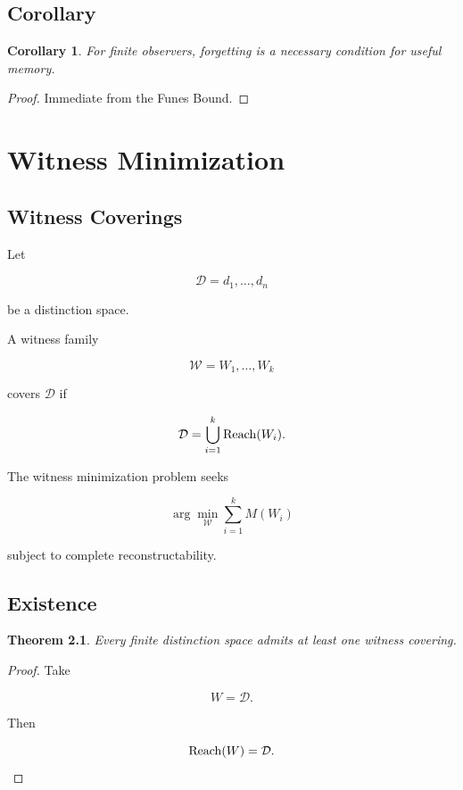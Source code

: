 \documentclass[12pt,oneside]{book}
\theoremstyle{plain} \newtheorem{theorem}{Theorem}[chapter] \newtheorem{lemma}[theorem]{Lemma} \newtheorem{proposition}[theorem]{Proposition} \newtheorem{corollary}[theorem]{Corollary}
\theoremstyle{definition} \newtheorem{definition}[theorem]{Definition} \newtheorem{axiom}[theorem]{Axiom} \newtheorem{construction}[theorem]{Construction}
\theoremstyle{remark} \newtheorem{remark}[theorem]{Remark} \newtheorem{example}[theorem]{Example}
\newcommand{\D}{\mathcal{D}} \newcommand{\R}{\mathcal{R}} \newcommand{\F}{\mathcal{F}} \newcommand{\U}{\mathcal{U}} \newcommand{\M}{\mathcal{M}} \newcommand{\G}{\Gamma}
\begin{document}
\section{Corollary}

\begin{corollary}

For finite observers, forgetting is a necessary condition for useful memory.

\end{corollary}

\begin{proof}

Immediate from the Funes Bound.

\end{proof}

\chapter{Witness Minimization}

\section{Witness Coverings}

Let

\[
\D
=
{d_1,\ldots,d_n}
\]

be a distinction space.

A witness family

\[
\mathcal W
=
{W_1,\ldots,W_k}
\]

covers $\D$ if

\[
\D
=
\bigcup_{i=1}^{k}
\Reach(W_i).
\]

The witness minimization problem seeks

\[
\arg\min_{\mathcal W}
\sum_{i=1}^{k}
M(W_i)
\]

subject to complete reconstructability.

\section{Existence}

\begin{theorem}

Every finite distinction space admits at least one witness covering.

\end{theorem}

\begin{proof}

Take

\[
W=\D.
\]

Then

\[
\Reach(W)=\D.
\]

\end{proof}
\end{document}
